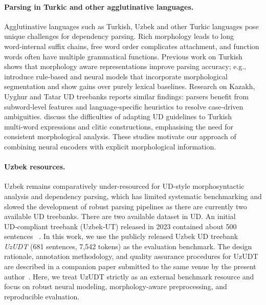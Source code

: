 \documentclass[runningheads]{llncs}
\begin{document}
\paragraph{Parsing in Turkic and other agglutinative languages.}
Agglutinative languages such as Turkish, Uzbek and other Turkic languages pose unique challenges for dependency parsing.  Rich morphology leads to long word‑internal suffix chains, free word order complicates attachment, and function words often have multiple grammatical functions\cite{MURZINTCEV2026100195}.  Previous work on Turkish shows that morphology aware representations improve parsing accuracy; e.g., \cite{eryigit-etal-2008-dependency} introduce rule‑based and neural models that incorporate morphological segmentation and show gains over purely lexical baselines.  Research on Kazakh, Uyghur and Tatar UD treebanks reports similar findings: parsers benefit from subword‑level features and language‑specific heuristics to resolve case‑driven ambiguities\cite{Marsan_undated-hp}.  \cite{noauthor_2018-qq} discuss the difficulties of adapting UD guidelines to Turkish multi‑word expressions and clitic constructions, emphasising the need for consistent morphological analysis.  These studies motivate our approach of combining neural encoders with explicit morphological information.

\paragraph{Uzbek resources.}
Uzbek remains comparatively under-resourced for UD-style morphosyntactic analysis and dependency parsing, which has limited systematic benchmarking and slowed the development of robust parsing pipelines as there are currently two available UD treebanks. There are two available dataset in UD. An initial UD‑compliant treebank (Uzbek‑UT) released in 2023 contained about 500 sentences~\cite{akhundjanova-talamo-2025-universal} .   In this work, we use the publicly released Uzbek UD treebank \emph{UzUDT} (681 sentences, 7{,}542 tokens) as the evaluation benchmark. The design rationale, annotation methodology, and quality assurance procedures for UzUDT are described in a companion paper submitted to the same venue by the present author~\cite{matlatipov2025goldudt}. Here, we treat UzUDT strictly as an external benchmark resource and focus on robust neural modeling, morphology-aware preprocessing, and reproducible evaluation. 
\end{document}
